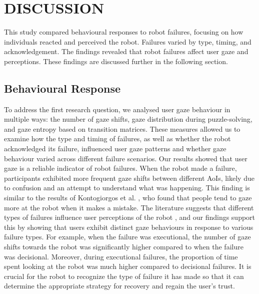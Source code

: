 \section{DISCUSSION}  


This study compared behavioural responses to robot failures, focusing on how individuals reacted and perceived the robot. Failures varied by type, timing, and acknowledgement. The findings revealed that robot failures affect user gaze and perceptions. These findings are discussed further in the following section.

\subsection{Behavioural Response}

To address the first research question, we analysed user gaze behaviour in multiple ways: the number of gaze shifts, gaze distribution during puzzle-solving, and gaze entropy based on transition matrices. These measures allowed us to examine how the type and timing of failures, as well as whether the robot acknowledged its failure, influenced user gaze patterns and whether gaze behaviour varied across different failure scenarios. Our results showed that user gaze is a reliable indicator of robot failures. When the robot made a failure, participants exhibited more frequent gaze shifts between different AoIs, likely due to confusion and an attempt to understand what was happening. This finding is similar to the results of Kontogiorgos et al. \cite{kontogiorgos_embodiment_2020}, who found that people tend to gaze more at the robot when it makes a mistake. The literature suggests that different types of failures influence user perceptions of the robot \cite{morales_interaction_2019}, and our findings support this by showing that users exhibit distinct gaze behaviours in response to various failure types. For example, when the failure was executional, the number of gaze shifts towards the robot was significantly higher compared to when the failure was decisional. Moreover, during executional failures, the proportion of time spent looking at the robot was much higher compared to decisional failures. It is crucial for the robot to recognize the type of failure it has made so that it can determine the appropriate strategy for recovery and regain the user's trust.



